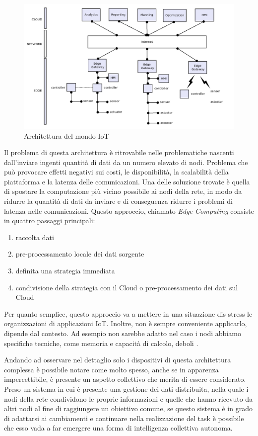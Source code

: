 \documentclass[12pt,a4paper,openright,twoside]{book}
\begin{document}
\begin{figure}
    \centering
    \includegraphics[width=.8\linewidth]{figures/iot-arc.png}
    \caption{Architettura del mondo IoT}
    \label{fig:iot-arc}
\end{figure}

Il problema di questa architettura è ritrovabile nelle problematiche nascenti dall'inviare ingenti quantità di dati da un numero elevato di nodi. Problema che può provocare effetti negativi sui costi, le disponibilità, la scalabilità della piattaforma e la latenza delle comunicazioni. Una delle soluzione trovate è quella di spostare la computazione più vicino possibile ai nodi della rete, in modo da ridurre la quantità di dati da inviare e di conseguenza ridurre i problemi di latenza nelle comunicazioni. Questo approccio, chiamato \textit{Edge Computing} consiste in quattro passaggi principali: 

\begin{enumerate}
    \item raccolta dati
    \item pre-processamento locale dei dati sorgente
    \item definita una strategia immediata 
    \item condivisione della strategia con il Cloud o pre-processamento dei dati sul Cloud
\end{enumerate}

Per quanto semplice, questo approccio va a mettere in una situazione dis stress le organizzazioni di applicazioni IoT. Inoltre, non è sempre conveniente applicarlo, dipende dal contesto. Ad esempio non sarebbe adatto nel caso i nodi abbiamo specifiche tecniche, come memoria e capacità di calcolo, deboli \cite{Testa2022}. 

Andando ad osservare nel dettaglio solo i dispositivi di questa architettura complessa è possibile notare come molto spesso, anche se in apparenza impercettibile, è presente un aspetto collettivo che merita di essere considerato. Preso un sistema in cui è presente una gestione dei dati distribuita, nella quale i nodi della rete condividono le proprie informazioni e quelle che hanno ricevuto da altri nodi al fine di raggiungere un obiettivo comune, se questo sistema è in grado di adattarsi ai cambiamenti e continuare nella realizzazione del task è possibile che esso vada a far emergere una forma di intelligenza collettiva autonoma. 
\end{document}
